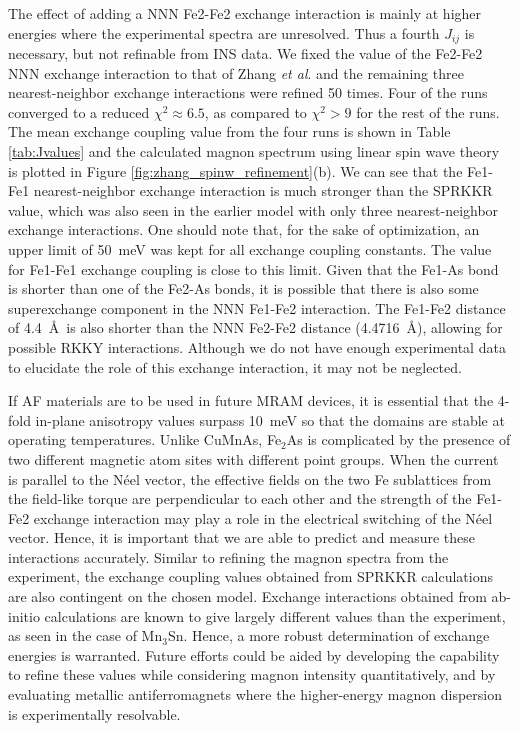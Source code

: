 \documentclass[10pt,doublespacing,edeposit]{uiucthesis2020}
\begin{document}
\begin{mainmatter}
The effect of adding a NNN Fe2-Fe2 exchange interaction is mainly at higher energies where the experimental spectra are unresolved. Thus a fourth $J_{ij}$ is necessary, but not refinable from INS data. We fixed the value of the Fe2-Fe2 NNN exchange interaction to that of Zhang \emph{et al}.\cite{Zhang2013} and the remaining three nearest-neighbor exchange interactions were refined 50 times. Four of the runs converged to a reduced $\chi^2 \approx 6.5$, as compared to $\chi^2 > 9$ for the rest of the runs. The mean exchange coupling value from the four runs is shown in Table \ref{tab:Jvalues} and the calculated magnon spectrum using linear spin wave theory is plotted in Figure \ref{fig:zhang_spinw_refinement}(b). We can see that the Fe1-Fe1 nearest-neighbor exchange interaction is much stronger than the SPRKKR value, which was also seen in the earlier model with only three nearest-neighbor exchange interactions. One should note that, for the sake of optimization, an upper limit of 50~meV was kept for all exchange coupling constants. The value for Fe1-Fe1 exchange coupling is close to this limit. Given that the Fe1-As bond is shorter than one of the Fe2-As bonds, it is possible that there is also some superexchange component in the NNN Fe1-Fe2 interaction. The Fe1-Fe2 distance of 4.4~\AA\ is also shorter than the NNN Fe2-Fe2 distance (4.4716~\AA), allowing for possible RKKY interactions. Although we do not have enough experimental data to elucidate the role of this exchange interaction, it may not be neglected.

If AF materials are to be used in future MRAM devices, it is essential that the 4-fold in-plane anisotropy values surpass 10~meV so that the domains are stable at operating temperatures. Unlike CuMnAs, Fe$_2$As is complicated by the presence of two different magnetic atom sites with different point groups. When the current is parallel to the N\'eel vector, the effective fields on the two Fe sublattices from the field-like torque are perpendicular to each other and the strength of the Fe1-Fe2 exchange interaction may play a role in the electrical switching of the N\'{e}el vector. Hence, it is important that we are able to predict and measure these interactions accurately. Similar to refining the magnon spectra from the experiment, the exchange coupling values obtained from SPRKKR calculations are also contingent on the chosen model. Exchange interactions obtained from ab-initio calculations are known to give largely different values than the experiment, as seen in the case of Mn$_3$Sn.\cite{Park2018} Hence, a more robust determination of exchange energies is warranted. Future efforts could be aided by developing the capability to refine these values while considering magnon intensity quantitatively, and by evaluating metallic antiferromagnets where the higher-energy magnon dispersion is experimentally resolvable. 



\end{mainmatter}
\end{document}
